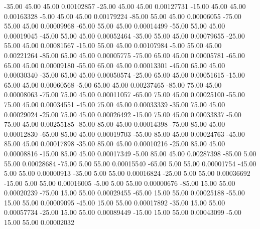     -35.00     45.00     45.00     0.00102857
    -25.00     45.00     45.00     0.00127731
    -15.00     45.00     45.00     0.00163328
     -5.00     45.00     45.00     0.00179224
    -85.00     55.00     45.00     0.00006055
    -75.00     55.00     45.00     0.00009968
    -65.00     55.00     45.00     0.00014499
    -55.00     55.00     45.00     0.00019045
    -45.00     55.00     45.00     0.00052464
    -35.00     55.00     45.00     0.00079655
    -25.00     55.00     45.00     0.00081567
    -15.00     55.00     45.00     0.00107984
     -5.00     55.00     45.00     0.00221264
    -85.00     65.00     45.00     0.00005775
    -75.00     65.00     45.00     0.00005781
    -65.00     65.00     45.00     0.00009180
    -55.00     65.00     45.00     0.00013301
    -45.00     65.00     45.00     0.00030340
    -35.00     65.00     45.00     0.00050574
    -25.00     65.00     45.00     0.00051615
    -15.00     65.00     45.00     0.00060568
     -5.00     65.00     45.00     0.00237465
    -85.00     75.00     45.00     0.00008063
    -75.00     75.00     45.00     0.00011057
    -65.00     75.00     45.00     0.00025100
    -55.00     75.00     45.00     0.00034551
    -45.00     75.00     45.00     0.00033339
    -35.00     75.00     45.00     0.00029024
    -25.00     75.00     45.00     0.00026492
    -15.00     75.00     45.00     0.00033837
     -5.00     75.00     45.00     0.00255185
    -85.00     85.00     45.00     0.00014398
    -75.00     85.00     45.00     0.00012830
    -65.00     85.00     45.00     0.00019703
    -55.00     85.00     45.00     0.00024763
    -45.00     85.00     45.00     0.00017898
    -35.00     85.00     45.00     0.00010216
    -25.00     85.00     45.00     0.00008816
    -15.00     85.00     45.00     0.00017349
     -5.00     85.00     45.00     0.00287398
    -85.00      5.00     55.00     0.00028684
    -75.00      5.00     55.00     0.00015540
    -65.00      5.00     55.00     0.00001754
    -45.00      5.00     55.00     0.00000913
    -35.00      5.00     55.00     0.00016824
    -25.00      5.00     55.00     0.00036692
    -15.00      5.00     55.00     0.00016005
     -5.00      5.00     55.00     0.00000676
    -85.00     15.00     55.00     0.00020239
    -75.00     15.00     55.00     0.00029455
    -65.00     15.00     55.00     0.00025188
    -55.00     15.00     55.00     0.00009095
    -45.00     15.00     55.00     0.00017892
    -35.00     15.00     55.00     0.00057734
    -25.00     15.00     55.00     0.00089449
    -15.00     15.00     55.00     0.00043099
     -5.00     15.00     55.00     0.00002032
